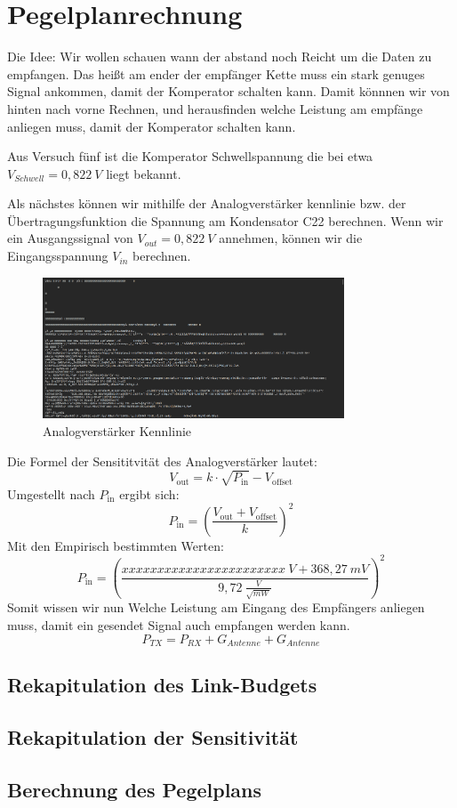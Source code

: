 \section{Pegelplanrechnung}
Die Idee: Wir wollen schauen wann der abstand noch Reicht um die Daten zu empfangen.
Das heißt am ender der empfänger Kette muss ein stark genuges Signal ankommen, damit der Komperator schalten kann.
Damit könnnen wir von hinten nach vorne Rechnen, und herausfinden welche Leistung am empfänge anliegen muss,
damit der Komperator schalten kann.

Aus Versuch fünf ist die Komperator Schwellspannung die bei etwa $V_{Schwell} = 0,822~V$ liegt bekannt.

Als nächstes können wir mithilfe der Analogverstärker kennlinie bzw. der Übertragungsfunktion die Spannung am Kondensator C22 berechnen.
Wenn wir ein Ausgangssignal von $V_{out} = 0,822~V$ annehmen, können wir die Eingangsspannung $V_{in}$ berechnen.

\begin{figure}
    \centering
    \includegraphics[width=0.8\textwidth]{Pictures/memeASCII.png}
    \caption{Analogverstärker Kennlinie}
    \label{fig:AnalogverstärkerKennlinie}
\end{figure}
Die Formel der Sensititvität des Analogverstärker lautet:
\begin{equation}
    V_\text{out} = k \cdot \sqrt{P_\text{in}} - V_\text{offset}
\end{equation}
Umgestellt nach $P_\text{in}$ ergibt sich:
\begin{equation}
    P_\text{in} = \left(\frac{V_\text{out} + V_\text{offset}}{k}\right)^2
\end{equation}
Mit den Empirisch bestimmten Werten:
\begin{equation}
    P_\text{in} = \left(\frac{xxxxxxxxxxxxxxxxxxxxxxx~V + 368,27~mV}{9,72~\frac{V}{\sqrt{mW}}}\right)^2
\end{equation}
Somit wissen wir nun Welche Leistung am Eingang des Empfängers anliegen muss, damit ein gesendet Signal auch empfangen werden kann.
\begin{equation}
    P_{TX} = P_{RX} + G_{Antenne} + G_{Antenne}
\end{equation}
\subsection{Rekapitulation des Link-Budgets}
\subsection{Rekapitulation der Sensitivität}
\subsection{Berechnung des Pegelplans}